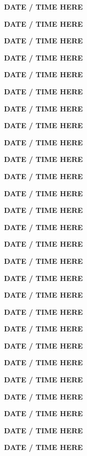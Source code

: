 \documentclass[12pt]{extbook}
\newcommand{\abstract}[2]{{
\begin{center}
\bfseries #1
\end{center}}
\par
}
\begin{document}
\clearpage

\abstract{DATE / TIME HERE}{abstracts/Blanc}
\abstract{DATE / TIME HERE}{abstracts/Brennwald}
\abstract{DATE / TIME HERE}{abstracts/Currle}
\abstract{DATE / TIME HERE}{abstracts/Daskalopoulou}
\abstract{DATE / TIME HERE}{abstracts/Dutoit}
\abstract{DATE / TIME HERE}{abstracts/Engelhardt}
\abstract{DATE / TIME HERE}{abstracts/Finger} %
\abstract{DATE / TIME HERE}{abstracts/Giroud}
\abstract{DATE / TIME HERE}{abstracts/GroegerTrampe}
\abstract{DATE / TIME HERE}{abstracts/Iwe}
\abstract{DATE / TIME HERE}{abstracts/Jacops}
\abstract{DATE / TIME HERE}{abstracts/Kimani}
\abstract{DATE / TIME HERE}{abstracts/Kipfer}
\abstract{DATE / TIME HERE}{abstracts/vanLeeuw} %
\abstract{DATE / TIME HERE}{abstracts/Lightfoot}
\abstract{DATE / TIME HERE}{abstracts/Marion}
\abstract{DATE / TIME HERE}{abstracts/Mtili}
\abstract{DATE / TIME HERE}{abstracts/Musy}
\abstract{DATE / TIME HERE}{abstracts/Ortega}
\abstract{DATE / TIME HERE}{abstracts/Picard}
\abstract{DATE / TIME HERE}{abstracts/Roques}
\abstract{DATE / TIME HERE}{abstracts/Slagter}
\abstract{DATE / TIME HERE}{abstracts/Strauch_Zimmer}
\abstract{DATE / TIME HERE}{abstracts/Tomonaga}
\abstract{DATE / TIME HERE}{abstracts/vanRooyen}
\abstract{DATE / TIME HERE}{abstracts/Wang}
\abstract{DATE / TIME HERE}{abstracts/Zhao}


\end{document}
